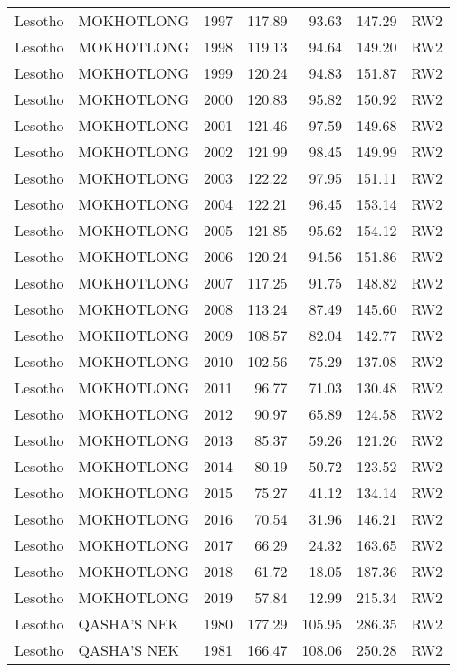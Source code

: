 \begin{longtable}{lllrrrl}
  Lesotho & MOKHOTLONG & 1997 & 117.89 & 93.63 & 147.29 & RW2 \\ 
  Lesotho & MOKHOTLONG & 1998 & 119.13 & 94.64 & 149.20 & RW2 \\ 
  Lesotho & MOKHOTLONG & 1999 & 120.24 & 94.83 & 151.87 & RW2 \\ 
  Lesotho & MOKHOTLONG & 2000 & 120.83 & 95.82 & 150.92 & RW2 \\ 
  Lesotho & MOKHOTLONG & 2001 & 121.46 & 97.59 & 149.68 & RW2 \\ 
  Lesotho & MOKHOTLONG & 2002 & 121.99 & 98.45 & 149.99 & RW2 \\ 
  Lesotho & MOKHOTLONG & 2003 & 122.22 & 97.95 & 151.11 & RW2 \\ 
  Lesotho & MOKHOTLONG & 2004 & 122.21 & 96.45 & 153.14 & RW2 \\ 
  Lesotho & MOKHOTLONG & 2005 & 121.85 & 95.62 & 154.12 & RW2 \\ 
  Lesotho & MOKHOTLONG & 2006 & 120.24 & 94.56 & 151.86 & RW2 \\ 
  Lesotho & MOKHOTLONG & 2007 & 117.25 & 91.75 & 148.82 & RW2 \\ 
  Lesotho & MOKHOTLONG & 2008 & 113.24 & 87.49 & 145.60 & RW2 \\ 
  Lesotho & MOKHOTLONG & 2009 & 108.57 & 82.04 & 142.77 & RW2 \\ 
  Lesotho & MOKHOTLONG & 2010 & 102.56 & 75.29 & 137.08 & RW2 \\ 
  Lesotho & MOKHOTLONG & 2011 & 96.77 & 71.03 & 130.48 & RW2 \\ 
  Lesotho & MOKHOTLONG & 2012 & 90.97 & 65.89 & 124.58 & RW2 \\ 
  Lesotho & MOKHOTLONG & 2013 & 85.37 & 59.26 & 121.26 & RW2 \\ 
  Lesotho & MOKHOTLONG & 2014 & 80.19 & 50.72 & 123.52 & RW2 \\ 
  Lesotho & MOKHOTLONG & 2015 & 75.27 & 41.12 & 134.14 & RW2 \\ 
  Lesotho & MOKHOTLONG & 2016 & 70.54 & 31.96 & 146.21 & RW2 \\ 
  Lesotho & MOKHOTLONG & 2017 & 66.29 & 24.32 & 163.65 & RW2 \\ 
  Lesotho & MOKHOTLONG & 2018 & 61.72 & 18.05 & 187.36 & RW2 \\ 
  Lesotho & MOKHOTLONG & 2019 & 57.84 & 12.99 & 215.34 & RW2 \\ 
  Lesotho & QASHA'S NEK & 1980 & 177.29 & 105.95 & 286.35 & RW2 \\ 
  Lesotho & QASHA'S NEK & 1981 & 166.47 & 108.06 & 250.28 & RW2 \\ 

\end{longtable}
